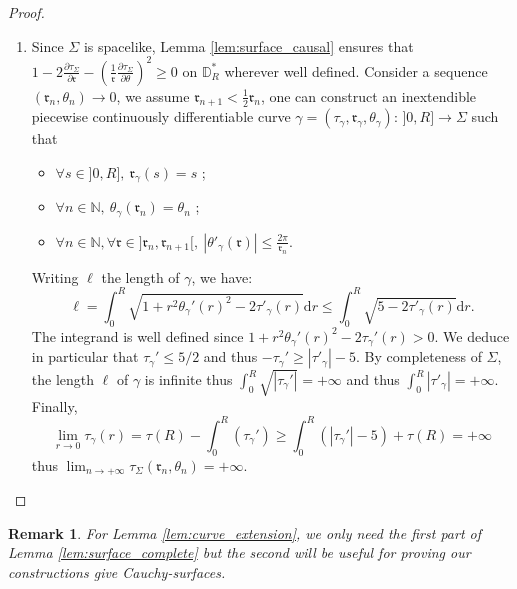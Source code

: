\documentclass[a4paper,12pt]{article}
\def\r{\mathfrak{r}}
\def\N{\mathbb N}
\def\d{\mathrm{d}}
\newtheorem{remark}{Remark}             %
\begin{document}
\begin{proof}
\begin{enumerate}
	
     
   \item    Since $\Sigma$ is spacelike,  Lemma \ref{lem:surface_causal} ensures that 
      $1-2\frac{\partial \tau_\Sigma}{\partial \r}-
      \left(\frac{1}{\r} \frac{\partial \tau_\Sigma}{\partial \theta}\right)^2 \geq 0$
      on $\mathbb D_R^*$ wherever well defined. Consider a sequence $(\r_n,\theta_n)\rightarrow 0$, we assume $\r_{n+1}<\frac{1}{2}\r_{n}$, one can construct
      an inextendible piecewise continuously differentiable curve $\gamma=(\tau_\gamma,\r_\gamma,\theta_\gamma):\,]0,R]\xrightarrow{~~} \Sigma$ such that
      \begin{itemize}
       \item  $\forall s\in ]0,R],~\r_\gamma(s)=s$ ;
       \item  $\forall n\in \N,~\theta_\gamma(\r_n)=\theta_n$ ;
       \item  $\forall n\in\N, \forall \r\in ]\r_n,\r_{n+1}[,~ |\theta'_\gamma(\r)|\leq \frac{2\pi}{\r_n} $.
      \end{itemize}		
      Writing $\ell$ the length of $\gamma$, we have:
      $$
      \ell = \int_{0}^{R} \sqrt{1+r^2\theta_\gamma'(r)^2-2 \tau'_\gamma(r)}\d r
       \leq  \int_{0}^{R} \sqrt{5-2 \tau'_\gamma(r)} \d r .
      $$
      The integrand is well defined since  $1+r^2\theta_\gamma'(r)^2-2 \tau_\gamma'(r)>0$. 
      We deduce in particular that $\tau_\gamma'\leq 5/2$ and thus $-\tau_\gamma'\geq |\tau'_\gamma|-5$. By completeness of $\Sigma$, the length $\ell$ of $\gamma$ is infinite thus 
      $\int_{0}^{R}\sqrt{|\tau_\gamma'|}=+\infty$ and thus $\int_0^{R}|\tau'_\gamma|=+\infty$.
      Finally, 
      $$\lim_{r\rightarrow 0}\tau_\gamma (r)=\tau(R)-\int_0^R\left(\tau_\gamma'\right) \geq \int_0^{R}\left(|\tau_\gamma'| -5\right)+\tau(R)=+\infty$$ 
thus    $\lim_{n\rightarrow +\infty}{\tau_\Sigma(\r_n,\theta_n)}=+\infty$.
      
      
        \end{enumerate}
      \end{proof}
    \begin{remark}\label{btzrem:lemma_lem_curve_extension}
     For Lemma \ref{lem:curve_extension}, we only need the first part of Lemma \ref{lem:surface_complete} but the second will be useful for proving our constructions give Cauchy-surfaces. 
    \end{remark}
\end{document}
